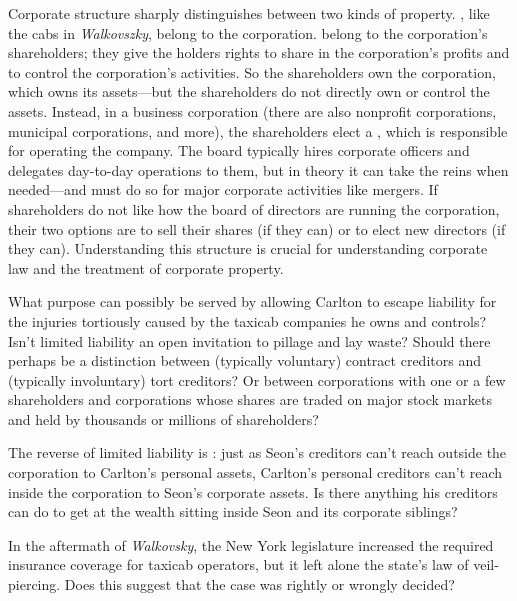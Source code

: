 \item Corporate structure sharply distinguishes between two kinds of property.
, like the cabs in \textit{Walkovszky},
belong to the corporation.  belong to
the corporation's shareholders;
they give the holders rights to share in the corporation's profits and to
control the corporation's activities. So the shareholders own the corporation,
which owns its assets---but the shareholders do not directly own or control the
assets. Instead, in a business corporation (there are also nonprofit
corporations, municipal corporations, and more), the shareholders elect a
, which is responsible for operating the company. The
board typically hires corporate officers and delegates day-to-day operations to
them, but in theory it can take the reins when needed---and must do so for major
corporate activities like mergers. If shareholders do not like how the board of
directors are running the corporation, their two options are to sell their
shares (if they can) or to elect new directors (if they can). Understanding this
structure is crucial for understanding corporate law and the treatment of
corporate property.

\item What purpose can possibly be served by allowing Carlton to escape
liability for the injuries tortiously caused by the taxicab companies he owns
and controls? Isn't limited liability an open invitation to pillage and lay
waste? Should there perhaps be a distinction between (typically voluntary)
contract creditors and (typically involuntary) tort creditors? Or between
 corporations with one or a few shareholders and
 corporations whose shares are traded on major
stock markets and held by thousands or millions of shareholders?

\item The reverse of limited liability is : just as
Seon's
creditors can't reach outside the corporation to Carlton's personal assets,
Carlton's personal creditors can't reach inside the corporation to Seon's
corporate assets. Is there anything his creditors can do to get at the wealth
sitting inside Seon and its corporate siblings?

\item In the aftermath of \textit{Walkovsky}, the New York legislature increased
the required insurance coverage for taxicab operators, but it left alone the
state's law of veil-piercing. Does this suggest that the case was rightly or
wrongly decided?

